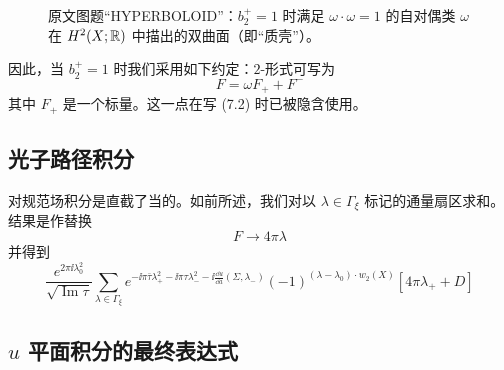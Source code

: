 \begin{figure}[H]
  \centering
  \caption{原文图题“HYPERBOLOID”：$b_2^{+}=1$ 时满足 $\omega\cdot\omega=1$ 的自对偶类 $\omega$ 在 $H^{2}(X;\mathbb{R})$ 中描出的双曲面（即“质壳”）。}
  \label{fig:hyperboloid}
\end{figure}

因此，当 $b_2^{+}=1$ 时我们采用如下约定：$2$-形式可写为
\begin{equation}
F=\omega F_{+}+F^{-}
\tag{7.3}
\end{equation}
其中 $F_{+}$ 是一个标量。这一点在写 (7.2) 时已被隐含使用。

\subsection{光子路径积分}

对规范场积分是直截了当的。如前所述，我们对以 $\lambda\in\Gamma_{\xi}$ 标记的通量扇区求和。结果是作替换
\begin{equation}
F\to4\pi\lambda
\tag{7.4}
\end{equation}
并得到
\begin{equation}
\frac{e^{2\pi\ii\lambda_0^{2}}}{\sqrt{\operatorname{Im}\tau}}
\sum_{\lambda\in\Gamma_{\xi}}
e^{-\ii\pi\bar\tau\lambda_+^{2}-\ii\pi\tau\lambda_-^{2}-\ii\frac{\dd u}{\dd a}(\Sigma,\lambda_-)}
(-1)^{(\lambda-\lambda_0)\cdot w_2(X)}
\left[4\pi\lambda_+ + D\right]
\tag{7.5}
\end{equation}

\subsection{$u$ 平面积分的最终表达式}

